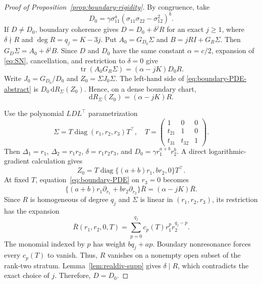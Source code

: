 \documentclass[12pt,a4paper]{article}
\theoremstyle{plain}
\theoremstyle{definition}
\newcommand{\tr}{\operatorname{tr}}
\begin{document}
\begin{proof}[Proof of Proposition~\ref{prop:boundary-rigidity}]
    By congruence, take
    \begin{equation*}
        D_0=\gamma\sigma_{11}^a(\sigma_{11}\sigma_{22}-\sigma_{12}^2)^b
        .
    \end{equation*}
    If $D\ne D_0$, boundary coherence gives $D=D_0+\delta^jR$ for an exact $j\ge1$, where $\delta\nmid R$ and $\deg R=q_j=K-3j$.
    Put $A_0=G_{D_0}\Sigma$ and $B=jRI+G_R\Sigma$.
    Then $G_D\Sigma=A_0+\delta^jB$.
    Since $D$ and $D_0$ have the same constant $\alpha=c/2$, expansion of \eqref{eq:SN}, cancellation, and restriction to $\delta=0$ give
    \begin{equation}
    \label{eq:boundary-PDE-abstract}
        \tr(A_0G_R\Sigma)=(\alpha-jK)D_0R
        .
    \end{equation}
    Write $J_0=G_{D_0}/D_0$ and $Z_0=\Sigma J_0\Sigma$.
    The left-hand side of \eqref{eq:boundary-PDE-abstract} is $D_0\,\mathrm{d}R_\Sigma(Z_0)$.
    Hence, on a dense boundary chart,
    \begin{equation}
    \label{eq:boundary-PDE}
        \mathrm{d}R_\Sigma(Z_0)=(\alpha-jK)R
        .
    \end{equation}

    Use the polynomial $LDL^\top$ parametrization
    \begin{equation*}
        \Sigma=T\operatorname{diag}(r_1,r_2,r_3)T^\top
        ,
        \quad
        T=
        \begin{pmatrix}
        1&0&0\\
        t_{21}&1&0\\
        t_{31}&t_{32}&1
        \end{pmatrix}
        .
    \end{equation*}
    Then $\Delta_1=r_1$, $\Delta_2=r_1r_2$, $\delta=r_1r_2r_3$, and $D_0=\gamma r_1^{a+b}r_2^b$.
    A direct logarithmic-gradient calculation gives
    \begin{equation*}
        Z_0=T\operatorname{diag}\{(a+b)r_1,br_2,0\}T^\top
        .
    \end{equation*}
    At fixed $T$, equation~\eqref{eq:boundary-PDE} on $r_3=0$ becomes
    \begin{equation*}
        \{(a+b)r_1\partial_{r_1}+br_2\partial_{r_2}\}\bar R
        =(\alpha-jK)\bar R
        .
    \end{equation*}
    Since $R$ is homogeneous of degree $q_j$ and $\Sigma$ is linear in $(r_1,r_2,r_3)$, its restriction has the expansion
    \begin{equation*}
        \bar R(r_1,r_2,0,T)
        =
        \sum_{p=0}^{q_j}c_p(T)r_1^pr_2^{q_j-p}
        .
    \end{equation*}
    The monomial indexed by $p$ has weight $bq_j+ap$.
    Boundary nonresonance forces every $c_p(T)$ to vanish.
    Thus, $R$ vanishes on a nonempty open subset of the rank-two stratum.
    Lemma~\ref{lem:realdiv-supp} gives $\delta\mid R$, which contradicts the exact choice of $j$.
    Therefore, $D=D_0$.
\end{proof}
\end{document}
